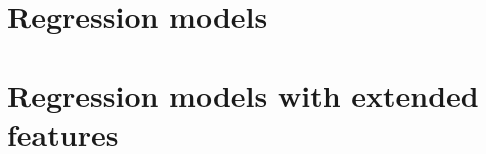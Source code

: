 \documentclass[%
oneside,    %
project,    %
nosummary   %
]{USN-MSc}
\begin{document}
\chapter{Regression models}
\label{ch:regression}
\lipsum[1]

\chapter{Regression models with extended features}
\label{ch:regressionExtended}
\lipsum[1]


~\nocite{*}

\cleardoublepage

\printbibliography[heading=bibintoc, title={References}]


\appendix
%
%
%
%
%
%
%
%
%
%
%
%
%
\end{document}
